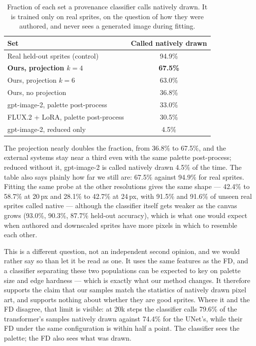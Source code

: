 \documentclass[10pt,twocolumn,letterpaper]{article}
\begin{document}
\begin{table}[h]
\caption{Fraction of each set a provenance classifier calls natively drawn. It is trained only on real sprites, on the
question of how they were authored, and never sees a generated image during fitting.}
\label{tab:probe}
\centering
\small
\begin{tabular}{@{}lc@{}}
\toprule
Set & Called natively drawn \\
\midrule
Real held-out sprites (control)        & 94.9\% \\
\textbf{Ours, projection $k{=}4$}      & \textbf{67.5\%} \\
Ours, projection $k{=}6$               & 63.0\% \\
Ours, no projection                    & 36.8\% \\
gpt-image-2, palette post-process      & 33.0\% \\
FLUX.2 + LoRA, palette post-process    & 30.5\% \\
gpt-image-2, reduced only              & 4.5\% \\
\bottomrule
\end{tabular}
\end{table}

The projection nearly doubles the fraction, from 36.8\% to 67.5\%, and the external systems stay near a third even
with the same palette post-process; reduced without it, gpt-image-2 is called natively drawn 4.5\% of the time. The
table also says plainly how far we still are: 67.5\% against 94.9\% for real sprites. Fitting the same probe at the
other resolutions gives the same shape --- 42.4\% to 58.7\% at 20\,px and 28.1\% to 42.7\% at 24\,px, with 91.5\% and
91.6\% of unseen real sprites called native --- although the classifier itself gets weaker as the canvas grows
(93.0\%, 90.3\%, 87.7\% held-out accuracy), which is what one would expect when authored and downscaled sprites have
more pixels in which to resemble each other.

This is a different question, not an independent second opinion, and we would rather say so than let it be read as
one. It uses the same features as the FD, and a classifier separating these two populations can be expected to key on
palette size and edge hardness --- which is exactly what our method changes. It therefore supports the claim that our
samples match the statistics of natively drawn pixel art, and supports nothing about whether they are good sprites.
Where it and the FD disagree, that limit is visible: at 20k steps the classifier calls 79.6\% of the transformer's
samples natively drawn against 74.4\% for the UNet's, while their FD under the same configuration is within half a
point. The classifier sees the palette; the FD also sees what was drawn.
\end{document}
